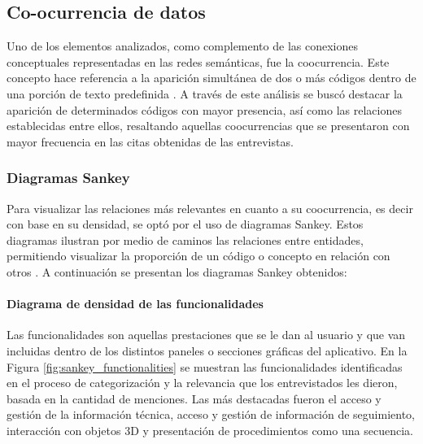                 

    \subsection{Co-ocurrencia de datos}
        
        Uno de los elementos analizados, como complemento de las conexiones conceptuales representadas en las redes semánticas, fue la coocurrencia. Este concepto hace referencia a la aparición simultánea de dos o más códigos dentro de una porción de texto predefinida \parencite{ESCALANTE:2009}. A través de este análisis se buscó destacar la aparición de determinados códigos con mayor presencia, así como las relaciones establecidas entre ellos, resaltando aquellas coocurrencias que se presentaron con mayor frecuencia en las citas obtenidas de las entrevistas. 

        \subsubsection{Diagramas Sankey}

            Para visualizar las relaciones más relevantes en cuanto a su coocurrencia, es decir con base en su densidad, se optó por el uso de diagramas Sankey. Estos diagramas ilustran por medio de caminos las relaciones entre entidades, permitiendo visualizar la proporción de un código o concepto en relación con otros \parencite{HECKER:SF}. A continuación se presentan los diagramas Sankey obtenidos:
            
            \paragraph{Diagrama de densidad de las funcionalidades}
            
                Las funcionalidades son aquellas prestaciones que se le dan al usuario y que van incluidas dentro de los distintos paneles o secciones gráficas del aplicativo. En la Figura \ref{fig:sankey_functionalities} se muestran las funcionalidades identificadas en el proceso de categorización y la relevancia que los entrevistados les dieron, basada en la cantidad de menciones. Las más destacadas fueron el acceso y gestión de la información técnica, acceso y gestión de información de seguimiento, interacción con objetos 3D y presentación de procedimientos como una secuencia. 

